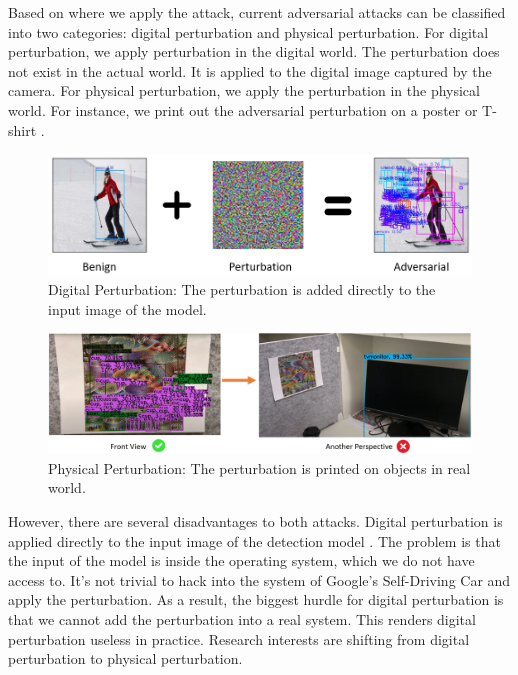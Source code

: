 Based on where we apply the attack, current adversarial attacks can be classified into two categories: digital perturbation and physical perturbation. For digital perturbation, we apply perturbation in the digital world. The perturbation does not exist in the actual world. It is applied to the digital image captured by the camera. For physical perturbation, we apply the perturbation in the physical world. For instance, we print out the adversarial perturbation on a poster \citep{lee2019physical} or T-shirt \citep{xu2020adversarial}.

\begin{figure}[H]
\centering
\includegraphics[scale=0.8]{figures/chapter_detection/digital.png}
\caption{Digital Perturbation: The perturbation is added directly to the input image of the model.}
\label{fig.adv_digital}
\end{figure}

\begin{figure}[H]
\centering
\includegraphics[scale=0.45]{figures/chapter_detection/physical.png}
\caption{Physical Perturbation: The perturbation is printed on objects in real world.}
\label{fig.adv_physical}
\end{figure}

However, there are several disadvantages to both attacks. Digital perturbation is applied directly to the input image of the detection model \citep{lu2017no}. The problem is that the input of the model is inside the operating system, which we do not have access to. It's not trivial to hack into the system of Google's Self-Driving Car and apply the perturbation. As a result, the biggest hurdle for digital perturbation is that we cannot add the perturbation into a real system. This renders digital perturbation useless in practice. Research interests are shifting from digital perturbation to physical perturbation. 

